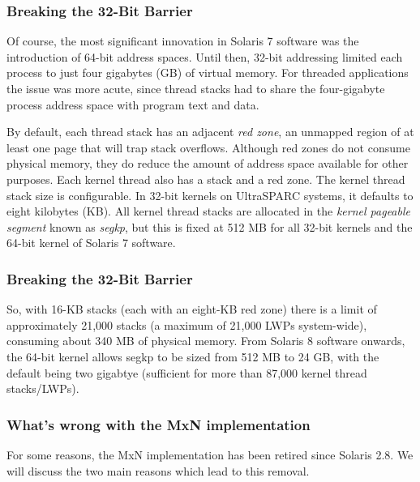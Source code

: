 
\begin{frame}
\frametitle{Breaking the 32-Bit Barrier}

Of course, the most significant innovation in Solaris 7 software was the introduction of 64-bit address spaces. Until then, 32-bit addressing limited each process to just four gigabytes (GB) of virtual memory. For threaded applications the issue was more acute, since thread stacks had to share the four-gigabyte process address space with program text and data.

\-

By default, each thread stack has an adjacent \textit{red zone}, an unmapped region of at least one page that will trap stack overflows. Although red zones do not consume physical memory, they do reduce the amount of address space available for other purposes. Each kernel thread also has a stack and a red zone. The kernel thread stack size is configurable. In 32-bit kernels on UltraSPARC systems, it defaults to eight kilobytes (KB).  All kernel thread stacks are allocated in the \textit{kernel pageable segment} known as \textit{segkp}, but this is fixed at 512 MB for all 32-bit kernels and the 64-bit kernel of Solaris 7 software.

\end{frame}


\begin{frame}
\frametitle{Breaking the 32-Bit Barrier}

So, with 16-KB stacks (each with an eight-KB red zone) there is a limit of approximately 21,000 stacks (a maximum of 21,000 LWPs system-wide), consuming about 340 MB of physical memory. From Solaris 8 software onwards, the 64-bit kernel allows segkp to be sized from 512 MB to 24 GB, with the default being two gigabtye (sufficient for more than 87,000 kernel thread stacks/LWPs).

\end{frame}


\begin{frame}
\frametitle{What's wrong with the MxN implementation}

For some reasons, the MxN implementation has been retired since Solaris 2.8. We will discuss the two main reasons which lead to this removal.

\end{frame}


